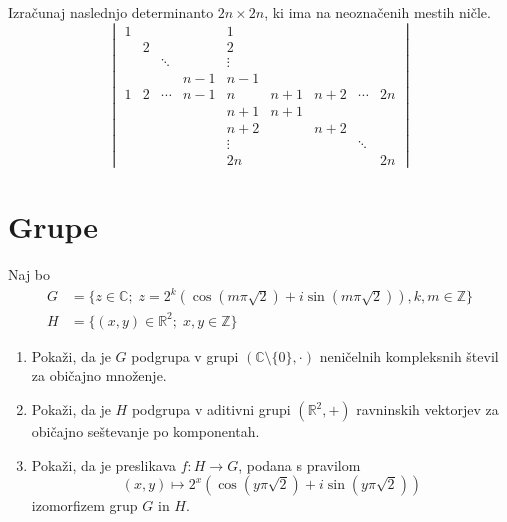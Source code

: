 \documentclass[a4paper,12pt]{article}
\begin{document}
Izračunaj naslednjo determinanto \(2n \times 2n\), ki ima na neoznačenih mestih ničle.
\[\begin{vmatrix}
     1 &&&& 1&&&&\\
     &2 &&& 2&&&&\\
    && \ddots && \vdots &&&&\\
     &&&n-1 & n-1 &&&&\\
     1 & 2 & \cdots & n-1 & n & n+1 & n+2 & \cdots & 2n\\
     &&&&n+1 & n+1 &&&\\
     &&&&n+2 && n+2 &&\\
    &&&& \vdots &&& \ddots &\\
     &&&&2n &&&& 2n
\end{vmatrix}\]

\section*{Grupe}

Naj bo
\begin{align*}
    G &= \{z\in \mathbb{C};\; z = 2^k(\cos(m\pi\sqrt{2})+ i\sin(m\pi\sqrt{2})),k,m\in\mathbb{Z}\}\\
    H&= \{(x,y)\in \mathbb{R}^2; \; x,y \in \mathbb{Z}\}
\end{align*}
\begin{enumerate}
\item
Pokaži, da je \(G\) podgrupa v grupi \((\mathbb{C}\setminus  \{0\},\cdot)\)
neničelnih kompleksnih števil za običajno množenje.

\item
Pokaži, da je \(H\) podgrupa v aditivni grupi \((\mathbb{R}^2,+)\)
ravninskih vektorjev za običajno seštevanje po komponentah.

\item
Pokaži, da je preslikava \(f:H\to G\), podana s pravilom
\[(x,y) \mapsto 2^x(\cos(y\pi\sqrt{2})+ i\sin(y\pi\sqrt{2}))\]
izomorfizem grup \(G\) in \(H\).
\end{enumerate}
\end{document}
